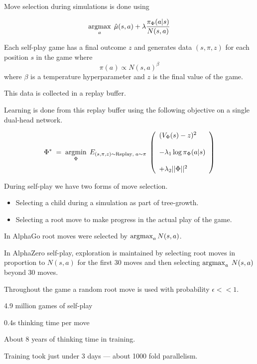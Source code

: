 {Move selection during simulations is done using

$$\operatorname*{argmax}_a \;\hat{\mu}(s,a) + \lambda \frac{\pi_\Phi(a|s)}{N(s,a)}$$

\vfill
Each self-play game has a final outcome $z$ and generates data $(s,\pi,z)$ for each position $s$ in the game where
$$\pi(a) \propto N(s,a)^\beta$$
where $\beta$ is a temperature hyperparameter and $z$ is the final value of the game.

\vfill
This data is collected in a replay buffer.


\vfill
Learning is done from this replay buffer using the following objective on a single dual-head network.

\vfill
$$\Phi^*\; = \;\operatorname*{argmin}_\Phi \;E_{(s,\pi,z) \sim \mathrm{Replay},\;a \sim \pi}\;\left(\begin{array}{l} (V_\Phi(s) - z)^2 \\ \\ - \lambda_1\log \pi_\Phi(a|s) \\ \\ + \lambda_2||\Phi||^2\end{array}\right)$$


During self-play we have two forms of move selection.

\begin{itemize}
\item Selecting a child during a simulation as part of tree-growth.
\item Selecting a root move to make progress in the actual play of the game.
\end{itemize}

\vfill
In AlphaGo root moves were selected by $\operatorname*{argmax}_a N(s,a)$.

\vfill
In AlphaZero self-play, exploration is maintained by selecting root moves in proportion to $N(s,a)$ for the first 30 moves and then
selecting $\operatorname*{argmax}_a\;N(s,a)$ beyond 30 moves.

\vfill
Throughout the game a random root move is used with probability $\epsilon << 1$.


4.9 million games of self-play

\vfill
0.4s thinking time per move

\vfill
About 8 years of thinking time in training.

\vfill
Training took just under 3 days --- about 1000 fold parallelism.

}
